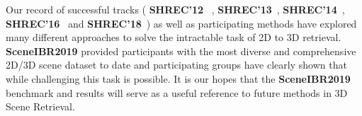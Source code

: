 \documentclass[../main.tex]{subfiles}
\begin{document}
Our record of successful tracks ( \textbf{SHREC'12} ~\cite{DBLP:conf/3dor/LiSGABBCEFHHJKORSSYYY12, DBLP:journals/cviu/0013LGSBFFFJMOPS14}, \textbf{SHREC'13}~\cite{DBLP:conf/3dor/LiLGSAJST13, DBLP:journals/cviu/0013LGSBFFFJMOPS14}, \textbf{SHREC'14}~\cite{DBLP:conf/3dor/LiLLGSABFFJLOTZ14, DBLP:journals/cviu/LiLLGSABCCFFFLLJKKOTWZZ15}, \textbf{SHREC'16}~\cite{DBLP:conf/3dor/0013LDDFQLLLLOT16} and \textbf{SHREC'18}~\cite{SHREC18-SceneIBR-Track}) as well as participating methods have explored many different approaches to solve the intractable task of 2D to 3D  retrieval. \textbf{SceneIBR2019} provided participants with the most diverse and comprehensive 2D/3D scene dataset to date and participating groups have clearly shown that while challenging this task is possible. It is our hopes that the \textbf{SceneIBR2019} benchmark and results will serve as a useful reference to future methods in 3D Scene Retrieval. 
\end{document}

